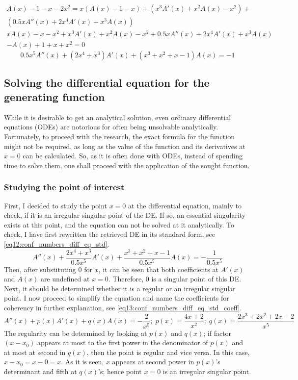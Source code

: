 \documentclass[stu, 11pt, a4paper, floatsintext]{apa7}
\begin{document}
	\begin{multline*}
		A(x)-1-x-2x^2=x\left(A(x)-1-x\right)+\left(x^3A'(x)+x^2A(x)-x^2\right)+ \\
		\left(0.5xA''(x)+2x^4A'(x)+x^3A(x)\right)
	\end{multline*}
	\begin{multline*}
		xA(x)-x-x^2+x^3A'(x)+x^2A(x)-x^2+0.5xA''(x)+2x^4A'(x)+x^3A(x) \\
		-A(x)+1+x+x^2=0
	\end{multline*}
	\begin{equation}
		\label{eq11:conf_numbers_diff_eq}
		0.5x^5A''(x)+\left(2x^4+x^3\right)A'(x)+\left(x^3+x^2+x-1\right)A(x)=-1
	\end{equation}
	\subsection{Solving the differential equation for the generating function}
	While it is desirable to get an analytical solution, even ordinary differential equations (ODEs) are notorious for often being unsolvable analytically. Fortunately, to proceed with the research, the exact formula for the function might not be required, as long as the value of the function and its derivatives at $x=0$ can be calculated. So, as it is often done with ODEs, instead of spending time to solve them, one shall proceed with the application of the sought function.
	\subsubsection{Studying the point of interest}
	First, I decided to study the point $x=0$ at the differential equation, mainly to check, if it is an irregular singular point of the DE. If so, an essential singularity exists at this point, and the equation can not be solved at it analytically. To check, I have first rewritten the retrieved DE in its standard form, see \cref{eq12:conf_numbers_diff_eq_std}.
	\begin{equation}
		\label{eq12:conf_numbers_diff_eq_std}
		A''(x)+\frac{2x^4+x^3}{0.5x^5}A'(x)+\frac{x^3+x^2+x-1}{0.5x^5}A(x)=-\frac{1}{0.5x^5}
	\end{equation}
	Then, after substituting 0 for $x$, it can be seen that both coefficients at $A'(x)$ and $A(x)$ are undefined at $x=0$. Therefore, 0 is a singular point of this DE. Next, it should be determined whether it is a regular or an irregular singular point. I now proceed to simplify the equation and name the coefficients for coherency in further explanation, see \cref{eq13:conf_numbers_diff_eq_std_coeff}.
	\begin{equation}
	\label{eq13:conf_numbers_diff_eq_std_coeff}
		A''(x)+p(x)A'(x)+q(x)A(x)=-\frac{2}{x^5};\;p(x)=\frac{4x+2}{x^2};\;q(x)=\frac{2x^3+2x^2+2x-2}{x^5}
	\end{equation}
	The regularity can be determined by looking at $p(x)$ and $q(x)$; if factor $(x-x_0)$ appears at most to the first power in the denominator of $p(x)$ and at most at second in $q(x)$, then the point is regular and vice versa. In this case, $x-x_0=x-0=x$. As it is seen, $x$ appears at second power in $p(x)$'s determinant and fifth at $q(x)$'s; hence point $x=0$ is an irregular singular point. 
\end{document}
